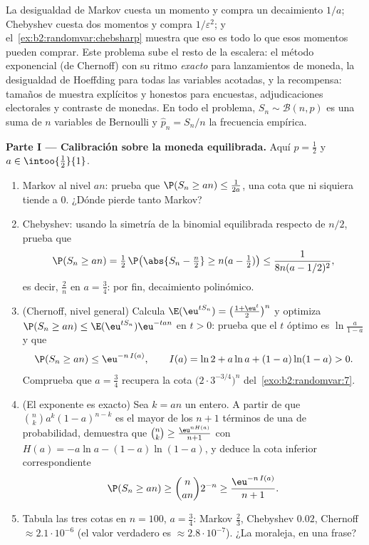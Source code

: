\begin{problem}
\label{pb:b2:randomvar:1}
La desigualdad de Markov cuesta un momento y compra un decaimiento
$1/a$; Chebyshev cuesta dos momentos y compra $1/\varepsilon^2$; y el~\cref{ex:b2:randomvar:chebsharp} muestra que eso es todo lo que esos
momentos pueden comprar. Este problema sube el resto de la escalera:
el método exponencial (de Chernoff) con su ritmo \emph{exacto} para
lanzamientos de moneda, la desigualdad de Hoeffding para todas las
variables acotadas, y la recompensa: tamaños de muestra explícitos y
honestos para encuestas, adjudicaciones electorales y contraste de
monedas.  En todo el problema, $S_n \sim
\mathcal B(n, p)$ es una suma de $n$ variables de Bernoulli
 y $\widehat p_n = S_n/n$ la frecuencia empírica.

\medskip
\noindent\textbf{Parte I --- Calibración sobre la moneda
equilibrada.} Aquí $p = \frac12$ y $a \in \intoo{\frac12}{1}$.
\begin{enumerate}
  \item Markov al nivel $an$: prueba que $\P(S_n \geq an) \leq
        \frac1{2a}$, una cota que ni siquiera tiende a $0$. ¿Dónde
        pierde tanto Markov?
  \item Chebyshev: usando la simetría de la binomial equilibrada
        respecto de $n/2$, prueba que
        \[
        \P(S_n \geq an) = \tfrac12\,
        \P\bigl(\abs{S_n - \tfrac n2} \geq n(a -
        \tfrac12)\bigr)
        \leq \frac{1}{8n(a - 1/2)^2},
        \]
        es decir, $\frac2n$ en $a = \frac34$: por fin, decaimiento
        polinómico.
  \item (Chernoff, nivel general) Calcula $\E(\eu^{tS_n}) =
        \bigl(\frac{1 + \eu^t}2\bigr)^n$ y optimiza $\P(S_n \geq an)
        \leq \E(\eu^{tS_n})\eu^{-tan}$ en $t > 0$: prueba que el $t$
        óptimo es $\ln\frac{a}{1-a}$ y que
        \[
        \P(S_n \geq an) \leq \eu^{-n\,I(a)},
        \qquad
        I(a) = \ln 2 + a\ln a + (1-a)\ln(1-a) > 0 .
        \]
        Comprueba que $a = \frac34$ recupera la cota
        $\bigl(2\cdot3^{-3/4}\bigr)^n$ del~\cref{exo:b2:randomvar:7}.
  \item (El exponente es exacto) Sea $k = an$ un entero. A partir de
        que $\binom nk a^k(1-a)^{n-k}$ es el mayor de los $n + 1$
        términos de una  de probabilidad, demuestra que
        $\binom nk \geq \frac{\eu^{nH(a)}}{n+1}$ con $H(a) = -a\ln a
        - (1-a)\ln(1-a)$, y deduce la cota inferior correspondiente
        \[
        \P(S_n \geq an) \geq \binom{n}{an}2^{-n}
        \geq \frac{\eu^{-n\,I(a)}}{n + 1} .
        \]
  \item Tabula las tres cotas en $n = 100$, $a = \frac34$: Markov
        $\frac23$, Chebyshev $0.02$, Chernoff $\approx
        2.1\cdot10^{-6}$ (el valor verdadero es $\approx
        2.8\cdot10^{-7}$). ¿La moraleja, en una frase?
\end{enumerate}


\end{problem}
